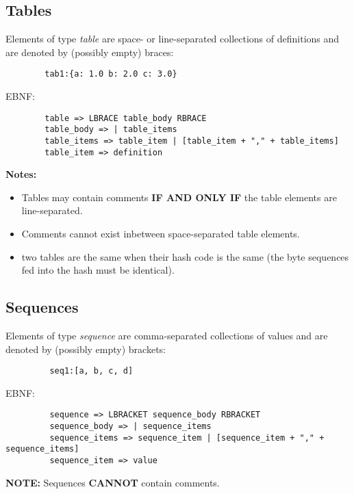 \documentclass{memarticle}
\begin{document}
{                \subsection{Tables}
                        Elements of type \emph{table} 
                        are space- or line-separated collections of definitions 
                        and are denoted by (possibly empty) braces:
                        \begin{verbatim}
        tab1:{a: 1.0 b: 2.0 c: 3.0}
                        \end{verbatim}
                        EBNF:
                        \begin{verbatim}
        table => LBRACE table_body RBRACE
        table_body => | table_items
        table_items => table_item | [table_item + "," + table_items]
        table_item => definition
                        \end{verbatim}
                        \par
                        \textbf{ Notes: }
                        \begin{itemize}
                                \item Tables may contain comments \textbf{ IF AND ONLY IF } 
                                                the table elements are line-separated. 
                                \item Comments cannot exist inbetween space-separated table elements.
                                \item two tables are the same when their hash code is the same 
                                                (the byte sequences fed into the hash must be identical).
                        \end{itemize}
                \subsection{Sequences}
                        Elements of type \emph{sequence} 
                        are comma-separated collections of values 
                        and are denoted by (possibly empty) brackets:
                        \begin{verbatim}
         seq1:[a, b, c, d]
                        \end{verbatim}
                        EBNF:
                        \begin{verbatim}
         sequence => LBRACKET sequence_body RBRACKET
         sequence_body => | sequence_items
         sequence_items => sequence_item | [sequence_item + "," + sequence_items]
         sequence_item => value
                        \end{verbatim}
                        \par
                        \textbf{ NOTE: } Sequences \textbf{ CANNOT } contain comments.
                \newpage
}
\end{document}
